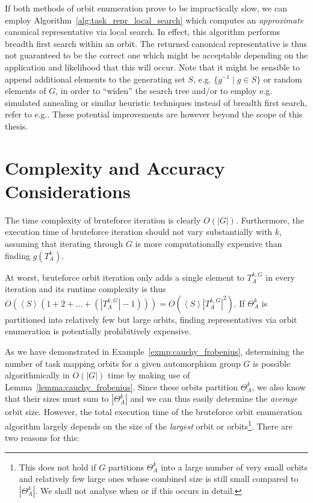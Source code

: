 If both methods of orbit enumeration prove to be impractically slow, we can
employ Algorithm~\ref{alg:task_repr_local_search} which computes an
\textit{approximate} canonical representative via local search. In effect, this
algorithm performs breadth first search within an orbit. The returned canonical
representative is thus not guaranteed to be the correct one which might be
acceptable depending on the application and likelihood that this will occur.
Note that it might be sensible to append additional elements to the generating
set $S$, e.g. $\{g^{-1} \mid g \in S\}$ or random elements of $G$, in order to
``widen'' the search tree and/or to employ e.g. simulated annealing or similar
heuristic techniques instead of breadth first search, refer to
e.g.\cite{Russell}. These potential improvements are however beyond the scope
of this thesis.

\section{Complexity and Accuracy Considerations}
\label{sec:tmor_complexity_and_accuracy_considerations}

The time complexity of bruteforce iteration is clearly $O(|G|)$.  Furthermore,
the execution time of bruteforce iteration should not vary substantially with
$k$, assuming that iterating through $G$ is more computationally expensive than
finding $g(T_{A}^k)$.

At worst, bruteforce orbit iteration only adds a single element to $T_A^{k,G}$
in every iteration and its runtime complexity is thus $O(\left<S\right> (1 + 2
+ \dots + (|T_A^{k,G}| - 1))) = O(\left<S\right> |T_A^{k,G}|^2)$. If
$\Theta_{A}^k$ is partitioned into relatively few but large orbits, finding
representatives via orbit enumeration is potentially prohibitively expensive.

As we have demonstrated in Example~\ref{exmp:cauchy_frobenius}, determining the
number of task mapping orbits for a given automorphism group $G$ is possible
algorithmically in $O(|G|)$ time by making use of
Lemma~\ref{lemma:cauchy_frobenius}. Since these orbits partition
$\Theta_{A}^k$, we also know that their sizes must sum to $|\Theta_{A}^k|$ and
we can thus easily determine the \textit{average} orbit size. However, the
total execution time of the bruteforce orbit enumeration algorithm largely
depends on the size of the \textit{largest} orbit or orbits\footnote{This does
not hold if $G$ partitions $\Theta_A^k$ into a large number of very small
orbits and relatively few large ones whose combined size is still small
compared to $|\Theta_A^k|$. We shall not analyse when or if this occurs in
detail.}. There are two reasons for this:

